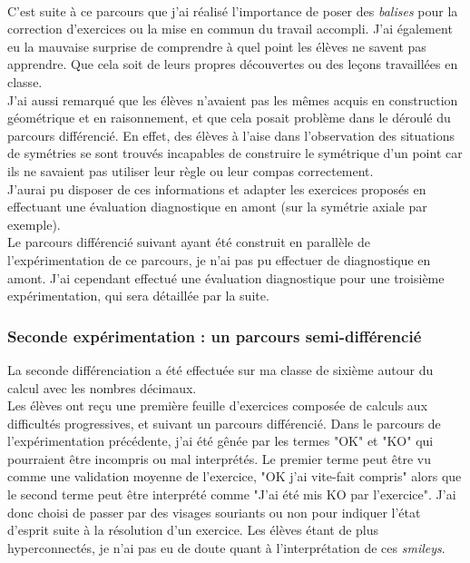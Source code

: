 \paragraph{}C'est suite à ce parcours que j'ai réalisé l'importance de poser des \textit{balises} pour la correction d'exercices ou la mise en commun du travail accompli. J'ai également eu la mauvaise surprise de comprendre à quel point les élèves ne savent pas apprendre. Que cela soit de leurs propres découvertes ou des leçons travaillées en classe.\\
J'ai aussi remarqué que les élèves n'avaient pas les mêmes acquis en construction géométrique et en raisonnement, et que cela posait problème dans le déroulé du parcours différencié. En effet, des élèves à l'aise dans l'observation des situations de symétries se sont trouvés incapables de construire le symétrique d'un point car ils ne savaient pas utiliser leur règle ou leur compas correctement.\\
J'aurai pu disposer de ces informations et adapter les exercices proposés en effectuant une évaluation diagnostique en amont (sur la symétrie axiale par exemple).\\
Le parcours différencié suivant ayant été construit en parallèle de l'expérimentation de ce parcours, je n'ai pas pu effectuer de diagnostique en amont. J'ai cependant effectué une évaluation diagnostique pour une troisième expérimentation, qui sera détaillée par la suite.\\


\subsubsection*{Seconde expérimentation : un parcours semi-différencié}
La seconde différenciation a été effectuée sur ma classe de sixième autour du calcul avec les nombres décimaux.\\
Les élèves ont reçu une première feuille d'exercices composée de calculs aux difficultés progressives, et suivant un parcours différencié. Dans le parcours de l'expérimentation précédente, j'ai été gênée par les termes "OK" et "KO" qui pourraient être incompris ou mal interprétés. Le premier terme peut être vu comme une validation moyenne de l'exercice, "OK j'ai vite-fait compris" alors que le second terme peut être interprété comme "J'ai été mis KO par l'exercice". J'ai donc choisi de passer par des visages souriants ou non pour indiquer l'état d'esprit suite à la résolution d'un exercice. Les élèves étant de plus hyperconnectés, je n'ai pas eu de doute quant à l'interprétation de ces \textit{smileys}.
